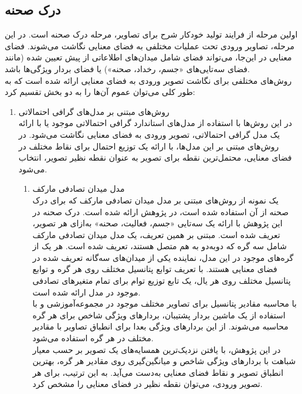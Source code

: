 \subsection{درک صحنه}

اولین مرحله از فرایند تولید خودکار شرح برای تصاویر، مرحله درک صحنه است. در این مرحله، تصاویر ورودی تحت عملیات مختلفی به فضای معنایی نگاشت می‌شوند. فضای معنایی در این‌جا، می‌تواند فضای شامل میدان‌های اطلاعاتی از پیش تعیین شده (مانند فضای سه‌تایی‌های «جسم، رخداد، صحنه») یا فضای بردار ویژگی‌ها باشد.
\\
روش‌های مختلفی برای نگاشت تصویر ورودی به فضای معنایی ارائه شده است که به طور کلی می‌توان عموم آن‌ها را به دو بخش تقسیم کرد:
\begin{enumerate}
\item
روش‌های مبتنی بر مدل‌های گرافی احتمالاتی\\
در این روش‌ها با استفاده از مدل‌های استاندارد گرافی احتمالاتی موجود یا با ارائه یک مدل گرافی احتمالاتی، تصویر ورودی به فضای معنایی نگاشت می‌شود. در روش‌های مبتنی بر این مدل‌ها، با ارائه یک توزیع احتمال برای نقاط مختلف در فضای معنایی، محتمل‌ترین نقطه برای تصویر به عنوان نقطه نظیر تصویر، انتخاب می‌شود.
	\begin{enumerate}
		\item مدل میدان تصادفی مارکف\\

یک نمونه از روش‌های مبتنی بر مدل میدان تصادفی مارکف که برای درک صحنه از آن استفاده شده است، در پژوهش\cite{Farhadi2010every} 
ارائه شده است. درک صحنه در این پژوهش با ارائه یک سه‌تایی «جسم، فعالیت، صحنه» به‌ازای هر تصویر، تعریف شده است. مبتنی بر همین تعریف، یک مدل میدان تصادفی مارکف شامل سه گره که دو‌به‌دو به هم متصل هستند، تعریف شده است. هر یک از گره‌های موجود در این مدل، نماینده یکی از میدان‌های سه‌گانه تعریف شده در فضای معنایی هستند. با تعریف توابع پتانسیل مختلف روی هر گره و توابع پتانسیل مختلف روی هر یال، یک تابع توزیع توام برای تمام متغیرهای تصادفی موجود در مدل ارائه شده است.
\\
با محاسبه مقادیر پتانسیل برای تصاویر مختلف موجود در مجموعه‌آموزشی و با استفاده از یک ماشین بردار پشتیبان، بردارهای ویژگی شاخص برای هر گره محاسبه می‌شوند. از این بردارهای ویژگی بعدا برای انطباق تصاویر با مقادیر مختلف در هر گره استفاده می‌شود.
\\
در این پژوهش،‌ با یافتن نزدیک‌ترین همسایه‌های یک تصویر بر حسب معیار شباهت با بردارهای ویژگی شاخص  و میانگین‌گیری روی مقادیر هر گره، بهترین انطباق تصویر و نقاط فضای معنایی به‌دست می‌آید. به این ترتیب، برای هر تصویر ورودی، می‌توان نقطه نظیر در فضای معنایی را مشخص کرد.
		

\end{enumerate}
\end{enumerate}
